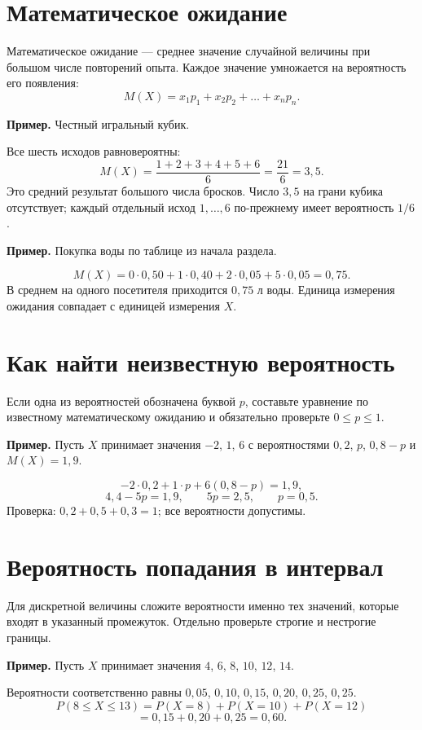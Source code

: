 \documentclass[a4paper,12pt]{article}
\newcommand{\key}[1]{\textcolor{darkaccent}{#1}}
\newcommand{\Ex}[1]{\par\medskip\noindent\textcolor{darkaccent}{\textbf{Пример.}} #1\par\smallskip}
\begin{document}
\section{Математическое ожидание}
\key{Математическое ожидание} --- среднее значение случайной величины при большом числе повторений опыта. Каждое значение умножается на вероятность его появления:
\[
\boxed{M(X)=x_1p_1+x_2p_2+\ldots+x_np_n.}
\]
\Ex{Честный игральный кубик.} Все шесть исходов равновероятны:
\[
M(X)=\frac{1+2+3+4+5+6}{6}=\frac{21}{6}=3{,}5.
\]
Это средний результат большого числа бросков. Число $3{,}5$ на грани кубика отсутствует; каждый отдельный исход $1,\ldots,6$ по-прежнему имеет вероятность $1/6$.

\Ex{Покупка воды по таблице из начала раздела.}
\[
M(X)=0\cdot0{,}50+1\cdot0{,}40+2\cdot0{,}05+5\cdot0{,}05=0{,}75.
\]
В среднем на одного посетителя приходится $0{,}75$ л воды. \key{Единица измерения ожидания совпадает с единицей измерения $X$.}

\section{Как найти неизвестную вероятность}
Если одна из вероятностей обозначена буквой $p$, составьте уравнение по известному математическому ожиданию и обязательно проверьте $0\le p\le1$.

\Ex{Пусть $X$ принимает значения $-2$, $1$, $6$ с вероятностями $0{,}2$, $p$, $0{,}8-p$ и $M(X)=1{,}9$.}
\[
-2\cdot0{,}2+1\cdot p+6(0{,}8-p)=1{,}9,
\]
\[
4{,}4-5p=1{,}9,\qquad 5p=2{,}5,\qquad \boxed{p=0{,}5}.
\]
Проверка: $0{,}2+0{,}5+0{,}3=1$; все вероятности допустимы.

\section{Вероятность попадания в интервал}
Для дискретной величины сложите вероятности именно тех значений, которые входят в указанный промежуток. Отдельно проверьте строгие и нестрогие границы.

\Ex{Пусть $X$ принимает значения $4$, $6$, $8$, $10$, $12$, $14$.} Вероятности соответственно равны $0{,}05$, $0{,}10$, $0{,}15$, $0{,}20$, $0{,}25$, $0{,}25$.
\[
P(8\le X\le 13)=P(X=8)+P(X=10)+P(X=12)
\]
\[
=0{,}15+0{,}20+0{,}25=\boxed{0{,}60}.
\]
\clearpage
\end{document}
